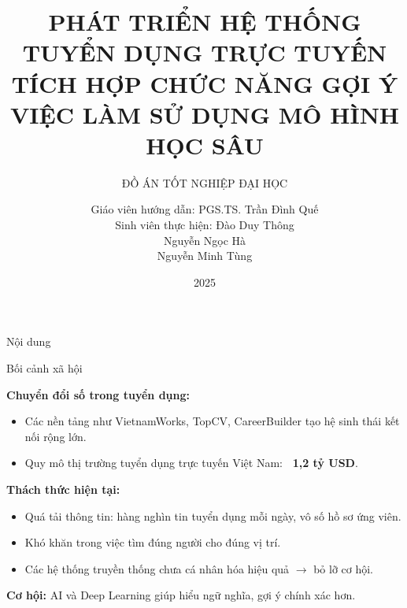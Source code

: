\documentclass[aspectratio=169,xcolor=dvipsnames, t]{beamer}
\title[Hệ thống gợi ý việc làm]{PHÁT TRIỂN HỆ THỐNG TUYỂN DỤNG TRỰC TUYẾN TÍCH HỢP CHỨC NĂNG GỢI Ý VIỆC LÀM SỬ DỤNG MÔ HÌNH HỌC SÂU} %
\subtitle{ĐỒ ÁN TỐT NGHIỆP ĐẠI HỌC}
\author{%
Giáo viên hướng dẫn: PGS.TS. Trần Đình Quế\\[0.3em]
Sinh viên thực hiện: Đào Duy Thông\\[0.1em]
\hspace*{3.45cm} Nguyễn Ngọc Hà\\[0.1em]
\hspace*{3.45cm} Nguyễn Minh Tùng%
}
\institute[]{Khoa CNTT 1 - PTIT
}
\date{2025} %
\begin{document}
\maketitlepage

\begin{frame}[t]{Nội dung}
    \tableofcontents
\end{frame}


\begin{frame}{Bối cảnh xã hội}
\justifying

\textbf{Chuyển đổi số trong tuyển dụng:}
\begin{itemize}
    \item Các nền tảng như VietnamWorks, TopCV, CareerBuilder tạo hệ sinh thái kết nối rộng lớn.
    \item Quy mô thị trường tuyển dụng trực tuyến Việt Nam: \textbf{~1,2 tỷ USD}.
\end{itemize}

\vspace{0.3cm}
\textbf{Thách thức hiện tại:}
\begin{itemize}
    \item Quá tải thông tin: hàng nghìn tin tuyển dụng mỗi ngày, vô số hồ sơ ứng viên.
    \item Khó khăn trong việc tìm đúng người cho đúng vị trí.
    \item Các hệ thống truyền thống chưa cá nhân hóa hiệu quả $\rightarrow$ bỏ lỡ cơ hội.
\end{itemize}

\vspace{0.3cm}
\textbf{Cơ hội:} AI và Deep Learning giúp hiểu ngữ nghĩa, gợi ý chính xác hơn.

\end{frame}
\end{document}

